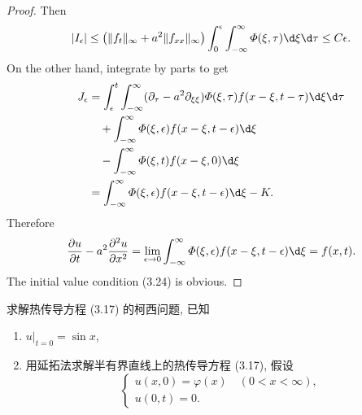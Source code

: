 \begin{proof}
  Then
  \begin{equation}\label{eq:d3}
    |I_\epsilon| \leq \bigl(\|f_t\|_\infty + a^2 \|f_{xx}\|_\infty\bigr)
      \int_0^\epsilon \int_{-\infty}^\infty \varPhi(\xi,\tau) \d\xi\d\tau \leq C\epsilon.
  \end{equation}
  On the other hand, integrate by parts to get
  \begin{equation}\label{eq:d4}
    \begin{aligned}
      J_\epsilon
      & = \int_\epsilon^t \int_{-\infty}^\infty (\partial_\tau - a^2\partial_{\xi\xi}) \varPhi(\xi,\tau)
          f(x-\xi,t-\tau) \d\xi\d\tau \\
      &   \quad + \int_{-\infty}^\infty \varPhi(\xi,\epsilon) f(x-\xi,t-\epsilon) \d\xi \\
      &   \quad - \int_{-\infty}^\infty \varPhi(\xi,t) f(x-\xi,0) \d\xi \\
      & = \int_{-\infty}^\infty \varPhi(\xi,\epsilon) f(x-\xi,t-\epsilon) \d\xi - K.
    \end{aligned}
  \end{equation}
  Therefore
  \begin{equation}\label{eq:d5}
    \frac{\partial u}{\partial t} - a^2\frac{\partial^2u}{\partial x^2}
      = \lim_{\epsilon\to 0} \int_{-\infty}^\infty \varPhi(\xi,\epsilon) f(x-\xi,t-\epsilon) \d\xi
      = f(x,t).
  \end{equation}
  The initial value condition (3.24) is obvious.
\end{proof}


\begin{exercise}[5]
  求解热传导方程 (3.17) 的柯西问题, 已知
  \begin{enumerate}[(1)]
    \item $u|_{t=0} = \sin x$,
    \item 用延拓法求解半有界直线上的热传导方程 (3.17), 假设
      \[\begin{cases}
        u(x,0) = \varphi(x)\quad (0<x<\infty), \\
        u(0,t) = 0.
      \end{cases}\]
  \end{enumerate}
\end{exercise}

